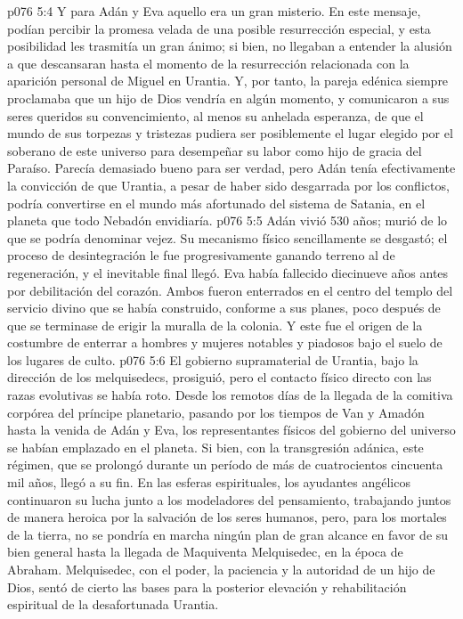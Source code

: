 \vs p076 5:4 Y para Adán y Eva aquello era un gran misterio. En este mensaje, podían percibir la promesa velada de una posible resurrección especial, y esta posibilidad les trasmitía un gran ánimo; si bien, no llegaban a entender la alusión a que descansaran hasta el momento de la resurrección relacionada con la aparición personal de Miguel en Urantia. Y, por tanto, la pareja edénica siempre proclamaba que un hijo de Dios vendría en algún momento, y comunicaron a sus seres queridos su convencimiento, al menos su anhelada esperanza, de que el mundo de sus torpezas y tristezas pudiera ser posiblemente el lugar elegido por el soberano de este universo para desempeñar su labor como hijo de gracia del Paraíso. Parecía demasiado bueno para ser verdad, pero Adán tenía efectivamente la convicción de que Urantia, a pesar de haber sido desgarrada por los conflictos, podría convertirse en el mundo más afortunado del sistema de Satania, en el planeta que todo Nebadón envidiaría.
\vs p076 5:5 \pc Adán vivió 530 años; murió de lo que se podría denominar vejez. Su mecanismo físico sencillamente se desgastó; el proceso de desintegración le fue progresivamente ganando terreno al de regeneración, y el inevitable final llegó. Eva había fallecido diecinueve años antes por debilitación del corazón. Ambos fueron enterrados en el centro del templo del servicio divino que se había construido, conforme a sus planes, poco después de que se terminase de erigir la muralla de la colonia. Y este fue el origen de la costumbre de enterrar a hombres y mujeres notables y piadosos bajo el suelo de los lugares de culto.
\vs p076 5:6 \pc El gobierno supramaterial de Urantia, bajo la dirección de los melquisedecs, prosiguió, pero el contacto físico directo con las razas evolutivas se había roto. Desde los remotos días de la llegada de la comitiva corpórea del príncipe planetario, pasando por los tiempos de Van y Amadón hasta la venida de Adán y Eva, los representantes físicos del gobierno del universo se habían emplazado en el planeta. Si bien, con la transgresión adánica, este régimen, que se prolongó durante un período de más de cuatrocientos cincuenta mil años, llegó a su fin. En las esferas espirituales, los ayudantes angélicos continuaron su lucha junto a los modeladores del pensamiento, trabajando juntos de manera heroica por la salvación de los seres humanos, pero, para los mortales de la tierra, no se pondría en marcha ningún plan de gran alcance en favor de su bien general hasta la llegada de Maquiventa Melquisedec, en la época de Abraham. Melquisedec, con el poder, la paciencia y la autoridad de un hijo de Dios, sentó de cierto las bases para la posterior elevación y rehabilitación espiritual de la desafortunada Urantia.
